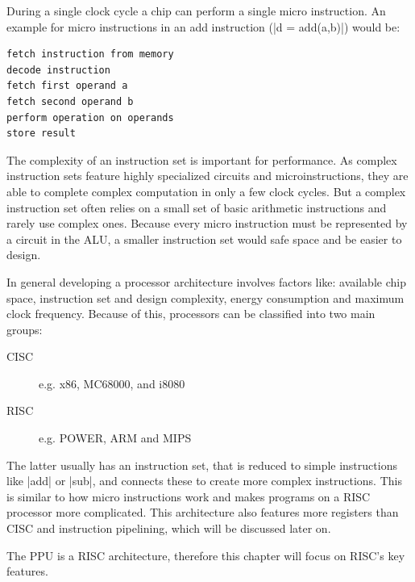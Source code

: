 During a single clock cycle a chip can perform a single micro instruction.
An example for micro instructions in an add instruction (|d = add(a,b)|) would be:
\begin{lstlisting}[caption=Example of Micro Instructions in an {\tt add} Instruction, label=lst:microinstruction]
fetch instruction from memory
decode instruction
fetch first operand a
fetch second operand b
perform operation on operands
store result
\end{lstlisting}

The complexity of an instruction set is important for performance. 
As complex instruction sets feature highly specialized circuits and microinstructions, they are able to complete complex computation in only a few clock cycles.
But a complex instruction set often relies on a small set of basic arithmetic instructions and rarely use complex ones.
Because every micro instruction must be represented by a circuit in the \ac{ALU}, a smaller instruction set would safe space and be easier to design.

In general developing a processor architecture involves factors like: available chip space, instruction set and design complexity, energy consumption and maximum clock frequency.
Because of this, processors can be classified into two main groups:
\begin{description}
    \item[\ac{CISC}] e.g. x86, MC68000, and i8080
    \item[\ac{RISC}] e.g. \acs{POWER}, ARM and MIPS
\end{description}
The latter usually has an instruction set, that is reduced to simple instructions like |add| or |sub|, and connects these to create more complex instructions.
This is similar to how micro instructions work and makes programs on a \ac{RISC} processor more complicated.
This architecture also features more registers than \ac{CISC} and instruction pipelining, which will be discussed later on.

The \ac{PPU} is a \ac{RISC} architecture, therefore this chapter will focus on \ac{RISC}'s key features.

